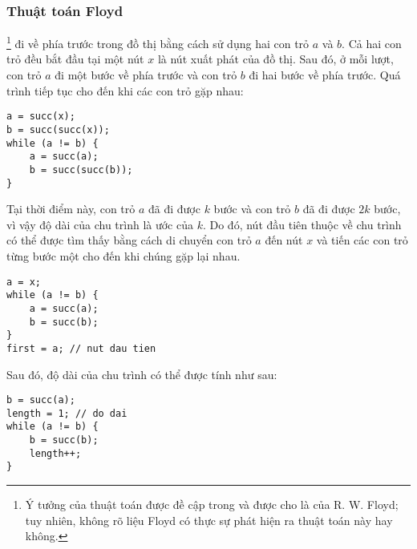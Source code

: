 \subsubsection{Thuật toán Floyd}


\footnote{Ý tưởng của thuật toán được đề cập trong \cite{knu982}
và được cho là của R. W. Floyd; tuy nhiên, không rõ liệu Floyd có thực sự
phát hiện ra thuật toán này hay không.} đi về phía trước
trong đồ thị bằng cách sử dụng hai con trỏ $a$ và $b$.
Cả hai con trỏ đều bắt đầu tại một nút $x$
là nút xuất phát của đồ thị.
Sau đó, ở mỗi lượt, con trỏ $a$ đi
một bước về phía trước và con trỏ $b$
đi hai bước về phía trước.
Quá trình tiếp tục cho đến khi
các con trỏ gặp nhau:
\begin{lstlisting}
a = succ(x);
b = succ(succ(x));
while (a != b) {
    a = succ(a);
    b = succ(succ(b));
}
\end{lstlisting}

Tại thời điểm này, con trỏ $a$ đã đi được $k$ bước
và con trỏ $b$ đã đi được $2k$ bước,
vì vậy độ dài của chu trình là ước của $k$.
Do đó, nút đầu tiên thuộc về chu trình
có thể được tìm thấy bằng cách di chuyển con trỏ $a$ đến nút $x$
và tiến các con trỏ
từng bước một cho đến khi chúng gặp lại nhau.
\begin{lstlisting}
a = x;
while (a != b) {
    a = succ(a);
    b = succ(b);
}
first = a; // nut dau tien
\end{lstlisting}

Sau đó, độ dài của chu trình
có thể được tính như sau:
\begin{lstlisting}
b = succ(a);
length = 1; // do dai
while (a != b) {
    b = succ(b);
    length++;
}
\end{lstlisting}